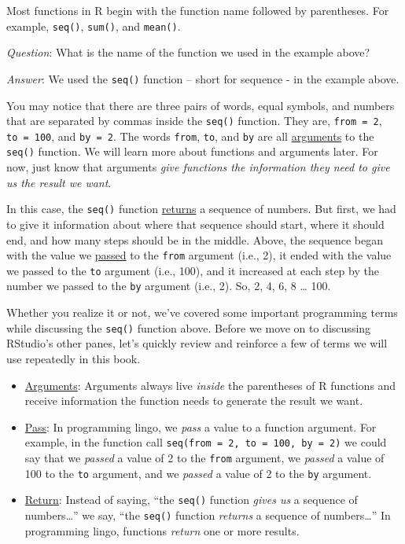 \documentclass[
  letterpaper,
  DIV=11,
  numbers=noendperiod]{scrreprt}
\begin{document}
Most functions in R begin with the function name followed by
parentheses. For example, \texttt{seq()}, \texttt{sum()}, and
\texttt{mean()}.

\emph{Question}: What is the name of the function we used in the example
above?

\emph{Answer}: We used the \texttt{seq()} function -- short for sequence
- in the example above.

You may notice that there are three pairs of words, equal symbols, and
numbers that are separated by commas inside the \texttt{seq()} function.
They are, \texttt{from\ =\ 2}, \texttt{to\ =\ 100}, and
\texttt{by\ =\ 2}. The words \texttt{from}, \texttt{to}, and \texttt{by}
are all \hyperref[glossary-arguments]{arguments} to the \texttt{seq()}
function. We will learn more about functions and arguments later. For
now, just know that arguments \emph{give functions the information they
need to give us the result we want}.

In this case, the \texttt{seq()} function
\hyperref[glossary-returns]{returns} a sequence of numbers. But first,
we had to give it information about where that sequence should start,
where it should end, and how many steps should be in the middle. Above,
the sequence began with the value we \hyperref[glossary-pass]{passed} to
the \texttt{from} argument (i.e., 2), it ended with the value we passed
to the \texttt{to} argument (i.e., 100), and it increased at each step
by the number we passed to the \texttt{by} argument (i.e., 2). So, 2, 4,
6, 8 \ldots{} 100.

Whether you realize it or not, we've covered some important programming
terms while discussing the \texttt{seq()} function above. Before we move
on to discussing RStudio's other panes, let's quickly review and
reinforce a few of terms we will use repeatedly in this book.

\begin{itemize}
\item
  \hyperref[glossary-arguments]{Arguments}: Arguments always live
  \emph{inside} the parentheses of R functions and receive information
  the function needs to generate the result we want.
\item
  \hyperref[glossary-pass]{Pass}: In programming lingo, we \emph{pass} a
  value to a function argument. For example, in the function call
  \texttt{seq(from\ =\ 2,\ to\ =\ 100,\ by\ =\ 2)} we could say that we
  \emph{passed} a value of 2 to the \texttt{from} argument, we
  \emph{passed} a value of 100 to the \texttt{to} argument, and we
  \emph{passed} a value of 2 to the \texttt{by} argument.
\item
  \hyperref[glossary-return]{Return}: Instead of saying, ``the
  \texttt{seq()} function \emph{gives us} a sequence of
  numbers\ldots{}'' we say, ``the \texttt{seq()} function \emph{returns}
  a sequence of numbers\ldots{}'' In programming lingo, functions
  \emph{return} one or more results.
\end{itemize}
\end{document}

